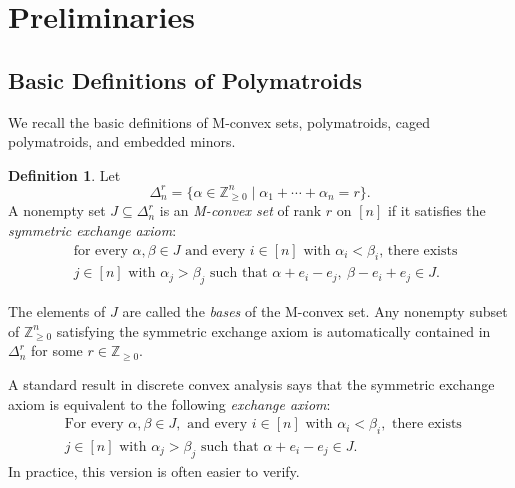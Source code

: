 \documentclass[11pt]{article}
\theoremstyle{definition}
\newtheorem{definition}[theorem]{Definition}
\theoremstyle{remark}
\newcommand{\Zgeq}{\mathbb{Z}_{\geq 0}}       %
\newcommand{\Zgeqn}{\mathbb{Z}_{\geq 0}^n}     %
\newcommand{\dnr}{\Delta_n^r}
\begin{document}
\section{Preliminaries}

\subsection{Basic Definitions of Polymatroids}

We recall the basic definitions of M-convex sets, polymatroids, caged polymatroids, and embedded minors.

\begin{definition}
    Let
    \[
        \dnr=\{\alpha\in\Zgeqn \mid \alpha_1+\cdots+\alpha_n=r\}.
    \]
    A nonempty set $J\subseteq\dnr$ is an \emph{M-convex set} of rank $r$ on $[n]$ if it satisfies the \emph{symmetric exchange axiom}:
    \begin{align*}
        \tag{SA}\label{def:m_convex_set}
        &\text{for every $\alpha,\beta\in J$ and every $i\in[n]$ with $\alpha_i<\beta_i$, there exists}\\
        &\text{$j\in[n]$ with $\alpha_j>\beta_j$ such that $\alpha+e_i-e_j,\ \beta-e_i+e_j\in J$.}
    \end{align*}
\end{definition}

The elements of $J$ are called the \emph{bases} of the M-convex set. Any nonempty subset of $\Zgeqn$ satisfying the symmetric exchange axiom is automatically contained in $\dnr$ for some $r\in\Zgeq$.

A standard result in discrete convex analysis \cite{murotaDiscreteConvexAnalysis2003} says that the symmetric exchange axiom is equivalent to the following \emph{exchange axiom}:
\begin{align*} \tag{EA} \label{def:weak_exchange_axiom}
        & \text{For every } \alpha,\beta \in J, \text{ and every } i \in [n] \text{ with } \alpha_i < \beta_i, \text{ there exists } \\ &j \in [n] \text{ with } \alpha_j > \beta_j \text{ such that } \alpha +e_i - e_j \in J.
\end{align*}
In practice, this version is often easier to verify.
\end{document}
